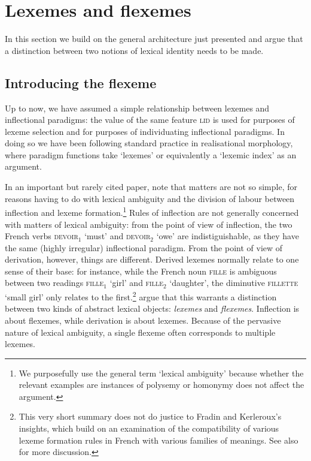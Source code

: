 \documentclass[output=paper]{langsci/langscibook}
\begin{document}
\section{Lexemes and flexemes}
\label{sec:3}


In this section we build on the general architecture just presented and argue that a distinction between two notions of lexical identity needs to be made.

\subsection{Introducing the flexeme}

Up to now, we have assumed a simple relationship between lexemes and
inflectional paradigms: the value of the same feature \textsc{lid} is
used for purposes of lexeme selection and for purposes of
individuating inflectional paradigms. In doing so we have been
following standard practice in realisational morphology, where
paradigm functions take `lexemes'
\citep{Stump01,Stump16} or equivalently a `lexemic index'
\citep{Spencer13} as an argument.

In an important but rarely cited paper, \citet{Fradin03b} note that
matters are not so simple, for reasons having to do with lexical
ambiguity and the division of labour between inflection and lexeme
formation.\footnote{We purposefully use the general term `lexical
  ambiguity' because whether the relevant examples are instances of
  polysemy or homonymy does not affect the argument.} Rules of
inflection are not generally
concerned with matters of lexical ambiguity: from the point of view of
inflection, the  two French verbs \textsc{devoir$_1$} `must' and
\textsc{devoir$_2$} `owe' are indistiguishable, as they have the same
(highly irregular) inflectional paradigm. From the point of view of
derivation, however, things are different. Derived lexemes normally
relate to one sense of their base: for instance, while the French noun
\textsc{fille} is ambiguous between two readings \textsc{fille$_1$}
`girl' and \textsc{fille$_2$} `daughter', the diminutive
\textsc{fillette} `small girl' only relates to the
first.\footnote{This very short summary does not do justice to
  Fradin and Kerleroux's insights, which build on an examination of
  the compatibility of various lexeme formation rules in French
  \citep{Fradin03b} with various families of meanings. See also
  \citet{Fradin09} for more discussion.}  \citet{Fradin03b} argue that
this warrants a distinction between two kinds of abstract lexical
objects: \emph{lexemes} and \emph{flexemes}. Inflection is about
flexemes, while derivation is about lexemes. Because of the pervasive nature
of lexical ambiguity, a single flexeme often corresponds to multiple
  lexemes.
\end{document}

